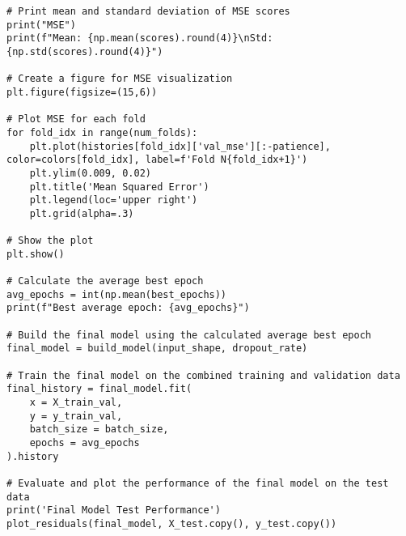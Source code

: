 \begin{lstlisting}[style=Python]
# Print mean and standard deviation of MSE scores
print("MSE")
print(f"Mean: {np.mean(scores).round(4)}\nStd:  {np.std(scores).round(4)}")

# Create a figure for MSE visualization
plt.figure(figsize=(15,6))

# Plot MSE for each fold
for fold_idx in range(num_folds):
    plt.plot(histories[fold_idx]['val_mse'][:-patience], color=colors[fold_idx], label=f'Fold N{fold_idx+1}')
    plt.ylim(0.009, 0.02)
    plt.title('Mean Squared Error')
    plt.legend(loc='upper right')
    plt.grid(alpha=.3)

# Show the plot
plt.show()

# Calculate the average best epoch
avg_epochs = int(np.mean(best_epochs))
print(f"Best average epoch: {avg_epochs}")

# Build the final model using the calculated average best epoch
final_model = build_model(input_shape, dropout_rate)

# Train the final model on the combined training and validation data
final_history = final_model.fit(
    x = X_train_val,
    y = y_train_val,
    batch_size = batch_size,
    epochs = avg_epochs
).history

# Evaluate and plot the performance of the final model on the test data
print('Final Model Test Performance')
plot_residuals(final_model, X_test.copy(), y_test.copy())
\end{lstlisting}